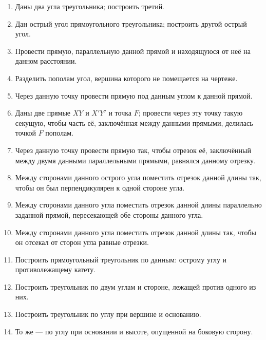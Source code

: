 \documentclass[oneside]{book}
\begin{document}
\begin{enumerate}[resume]

 \item
Даны два угла треугольника;
построить третий.

 \item
Дан острый угол прямоугольного треугольника;
построить другой острый угол.

 \item
Провести прямую, параллельную данной прямой и находящуюся от неё на данном расстоянии.

 \item
Разделить пополам угол, вершина которого не помещается на чертеже.

 \item
Через данную точку провести прямую под данным углом к данной прямой.

 \item
Даны две прямые $XY$ и $X'Y'$ и точка $F$;
провести через эту точку такую секущую, чтобы часть её, заключённая между данными прямыми, делилась точкой $F$ пополам.

 \item
Через данную точку провести прямую так, чтобы отрезок её, заключённый между двумя данными параллельными прямыми, равнялся данному отрезку.

 \item
Между сторонами данного острого угла поместить отрезок данной длины так, чтобы он был перпендикулярен к одной стороне угла.

 \item
Между сторонами данного угла поместить отрезок данной длины параллельно заданной прямой, пересекающей обе стороны данного угла.

 \item
Между сторонами данного угла поместить отрезок данной длины так, чтобы он отсекал от сторон угла равные отрезки.

 \item
Построить прямоугольный треугольник по данным:
острому углу и противолежащему катету.

 \item
Построить треугольник по двум углам и стороне, лежащей против одного из них.

 \item
Построить  треугольник по углу при вершине и основанию.

 \item
То же — по углу при основании и высоте, опущенной на боковую сторону.


\end{enumerate}
\end{document}
